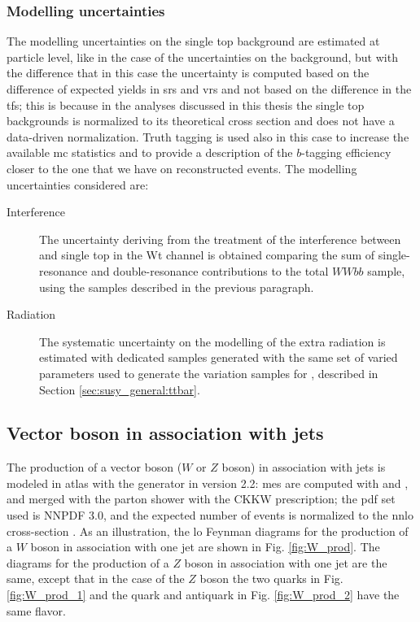 \subsubsection*{Modelling uncertainties}

The modelling uncertainties on the single top background are estimated at particle level, 
like in the case of the uncertainties on the \ttbar background, but with the difference that in this case the uncertainty is computed based on the difference of expected yields in \glspl{sr} and \glspl{vr} and not based on the difference in the \glspl{tf}; 
this is because in the analyses discussed in this thesis the single top backgrounds is normalized to its theoretical cross section and does not have a data-driven normalization. Truth tagging is used also in this case to increase the available \gls{mc} statistics and to provide a description of the $b$-tagging efficiency closer to the one that we have on reconstructed events. The modelling uncertainties considered are: 

\begin{description}
\item[Interference] The uncertainty deriving from the treatment of the interference between \ttbar and single top in the Wt channel is obtained comparing the sum of single-resonance and double-resonance contributions to the total $WWbb$ sample, using the samples described in the previous paragraph.

\item[Radiation] The systematic uncertainty on the modelling of the extra radiation is estimated with dedicated samples generated with the same set of varied parameters used to generate the variation samples for \ttbar, described in Section \ref{sec:susy_general:ttbar}. 

\end{description}

\subsection{Vector boson in association with jets}

The production of a vector boson ($W$ or $Z$ boson) in association with jets is modeled in \gls{atlas} with the \Sherpa generator in version 2.2: \glspl{me} are 
computed with \comix \cite{Gleisberg:2008fv} and \OL \cite{Cascioli:2011va}, and merged with the \Sherpa parton shower with the CKKW prescription; the \gls{pdf} set used is NNPDF 3.0, and the expected number of events is normalized to the \gls{nnlo} cross-section \cite{Catani:2009sm}.
As an illustration, the \gls{lo} Feynman diagrams for the production of a $W$ boson in association with one jet are shown in Fig. \ref{fig:W_prod}. 
The diagrams for the production of a $Z$ boson in association with one jet are the same, except that in the case of the $Z$ boson the 
two quarks in Fig. \ref{fig:W_prod_1} and the quark and antiquark in Fig. \ref{fig:W_prod_2} have the same flavor. 

